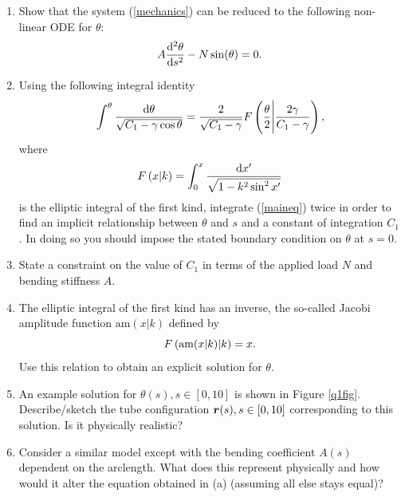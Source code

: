 \documentclass[a4paper,12pt]{article}
\begin{document}
\begin{enumerate}[label=(\alph*)]
\item{Show that the system (\ref{mechanics}) can be reduced to the following non-linear ODE for $\theta$:
\begin{equation}
\label{maineq}
A\fdd{\theta}{s} -N\sin(\theta)=0.
\end{equation} 
}\item{
Using the following integral identity 
\begin{equation*}
\int^{\theta}\frac{{\mathrm d}\theta}{\sqrt{C_1-\gamma\cos\theta}} = \frac{2}{\sqrt{C_1-\gamma}} F\left(\frac{\theta}{2}\large\bigg \vert \frac{2 \gamma}{C_1-\gamma}\right),
\end{equation*}
where 
\begin{equation*}
F\left(x\large\vert k\right) = \int_{0}^{x}\frac{{\mathrm d} x'}{\sqrt{1-k^2\sin^2 x'}}
\end{equation*}
is the elliptic integral of the first kind, integrate (\ref{maineq}) twice in order to find an implicit relationship between $\theta$ and $s$ and  a constant of integration $C_1$. In doing so you  should impose the stated boundary condition on $\theta$ at $s=0$. 
}\item{
State a constraint on the value of $C_1$ in terms of the applied load $N$ and bending stiffness $A$.
}\item{
The elliptic integral of the first kind has an inverse, the so-called Jacobi amplitude function $\mathrm{am}(x\vert k)$ defined by
\begin{equation*}
F\left(\mathrm{am}(x\vert k)\large\vert k\right) = x.
\end{equation*}
Use this relation to obtain an explicit solution for $\theta$.
}\item{An example solution for $\theta(s),s\in[0,10]$ is shown in Figure \ref{q1fig}. Describe/sketch the tube configuration $\v{r}(s),s\in[0,10]$ corresponding to this solution. Is it physically realistic? } 
\item{Consider a similar model except with the bending coefficient $A(s)$ dependent on the arclength. What does this represent physically and how would it alter the equation obtained in (a) (assuming all else stays equal)? }
\end{enumerate}
\end{document}
